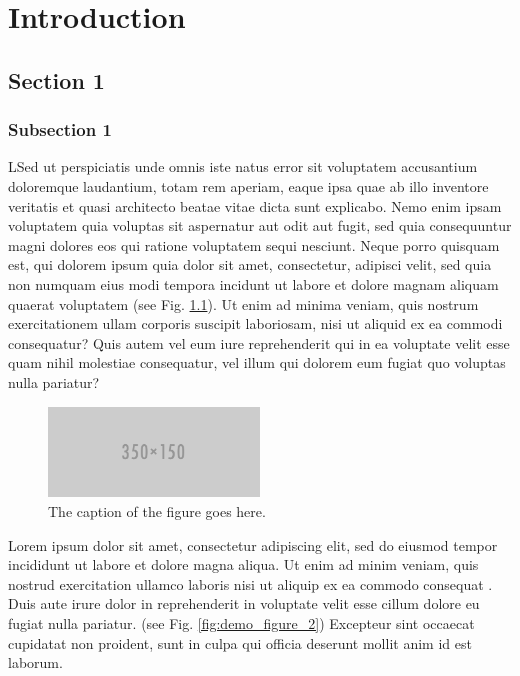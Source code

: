 \chapter{Introduction} %
\label{cha:_introduction}

\section{Section 1} %
\label{sec:section_11}
\lipsum[1-1]

\par
\lipsum[2-2]

\subsection{Subsection 1} %
\label{sub:subsection_111}

LSed ut perspiciatis unde omnis iste natus error sit voluptatem accusantium doloremque laudantium, totam rem aperiam, eaque ipsa quae ab illo inventore veritatis et quasi architecto beatae vitae dicta sunt explicabo. Nemo enim ipsam voluptatem quia voluptas sit aspernatur aut odit aut fugit, sed quia consequuntur magni dolores eos qui ratione voluptatem sequi nesciunt. Neque porro quisquam est, qui dolorem ipsum quia dolor sit amet, consectetur, adipisci velit, sed quia non numquam eius modi tempora incidunt ut labore et dolore magnam aliquam quaerat voluptatem (see Fig. \ref{fig:demo_figure_1}). Ut enim ad minima veniam, quis nostrum exercitationem ullam corporis suscipit laboriosam, nisi ut aliquid ex ea commodi consequatur? Quis autem vel eum iure reprehenderit qui in ea voluptate velit esse quam nihil molestiae consequatur, vel illum qui dolorem eum fugiat quo voluptas nulla pariatur? \cite{bruno,smith}

\begin{figure}[h]
\centering
\includegraphics[width=0.5\textwidth]{./img/350x150.png}
\caption{The caption of the figure goes here.}
\label{fig:demo_figure_1}
\end{figure}

\par
Lorem ipsum dolor sit amet, consectetur adipiscing elit, sed do eiusmod tempor incididunt ut labore et dolore magna aliqua. Ut enim ad minim veniam, quis nostrud exercitation ullamco laboris nisi ut aliquip ex ea commodo consequat \cite{bruno}. Duis aute irure dolor in reprehenderit in voluptate velit esse cillum dolore eu fugiat nulla pariatur. (see Fig. \ref{fig:demo_figure_2}) Excepteur sint occaecat cupidatat non proident, sunt in culpa qui officia deserunt mollit anim id est laborum. \cite{smith}

